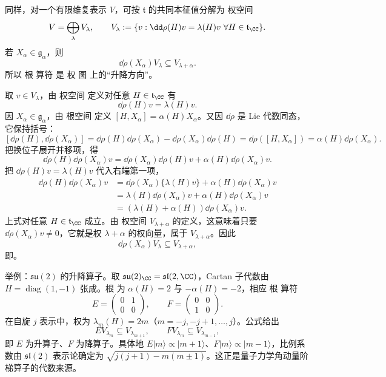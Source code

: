 同样，对一个有限维复表示 $V$，可按 $\mathfrak t$ 的共同本征值分解为 权空间
\begin{equation*}V=\bigoplus_{\lambda}V_\lambda,
\qquad
V_\lambda
:=\{v:\dd\rho(H)v=\lambda(H)v
\ \forall H\in\mathfrak t_\CC\}.\end{equation*}
若 $X_\alpha\in\mathfrak g_\alpha$，则
\begin{equation}
{
\dd\rho(X_\alpha)V_\lambda
\subseteq V_{\lambda+\alpha}.
}
\label{eq:math-lie-root-shifts-weight}
\end{equation}
所以 根 算符 是 权 图 上的“升降方向”。

取 $v\in V_\lambda$，由 权空间 定义对任意 $H\in\mathfrak t_\CC$ 有
\[
\dd\rho(H)v=\lambda(H)v.
\]
因 $X_\alpha\in\mathfrak g_\alpha$，由 根空间 定义 $[H,X_\alpha]=\alpha(H)X_\alpha$。又因 $\dd\rho$ 是 Lie 代数同态，它保持括号：
\[
[\dd\rho(H),\dd\rho(X_\alpha)]
=\dd\rho(H)\dd\rho(X_\alpha)-\dd\rho(X_\alpha)\dd\rho(H)
=\dd\rho([H,X_\alpha])
=\alpha(H)\dd\rho(X_\alpha).
\]
把换位子展开并移项，得
\[
\dd\rho(H)\dd\rho(X_\alpha)v
=\dd\rho(X_\alpha)\dd\rho(H)v
+\alpha(H)\dd\rho(X_\alpha)v.
\]
把 $\dd\rho(H)v=\lambda(H)v$ 代入右端第一项，
\begin{align*}
\dd\rho(H)\dd\rho(X_\alpha)v
&=\dd\rho(X_\alpha)\{\lambda(H)v\}
 +\alpha(H)\dd\rho(X_\alpha)v\\
&=\lambda(H)\dd\rho(X_\alpha)v
 +\alpha(H)\dd\rho(X_\alpha)v\\
&=(\lambda(H)+\alpha(H))\dd\rho(X_\alpha)v.
\end{align*}
上式对任意 $H\in\mathfrak t_\CC$ 成立。由 权空间 $V_{\lambda+\alpha}$ 的定义，这意味着只要 $\dd\rho(X_\alpha)v\neq0$，它就是权 $\lambda+\alpha$ 的权向量，属于 $V_{\lambda+\alpha}$。因此
\[
\dd\rho(X_\alpha)V_\lambda\subseteq V_{\lambda+\alpha},
\]
即。

举例：$\mathfrak{su}(2)$ 的升降算子。取 $\mathfrak{su}(2)_\CC=\mathfrak{sl}(2,\CC)$，Cartan 子代数由 $H=\operatorname{diag}(1,-1)$ 张成。根 为 $\alpha(H)=2$ 与 $-\alpha(H)=-2$，相应 根 算符
\[
E=\begin{pmatrix}0&1\\0&0\end{pmatrix},\qquad
F=\begin{pmatrix}0&0\\1&0\end{pmatrix}.
\]
在自旋 $j$ 表示中，权为 $\lambda_m(H)=2m$（$m=-j,-j+1,\ldots,j$）。公式给出
\[
E V_{\lambda_m}\subseteq V_{\lambda_{m+1}},\qquad
F V_{\lambda_m}\subseteq V_{\lambda_{m-1}},
\]
即 $E$ 为升算子、$F$ 为降算子。具体地 $E|m\rangle\propto|m+1\rangle$、$F|m\rangle\propto|m-1\rangle$，比例系数由 $\mathfrak{sl}(2)$ 表示论确定为 $\sqrt{j(j+1)-m(m\pm1)}$。这正是量子力学角动量阶梯算子的代数来源。

